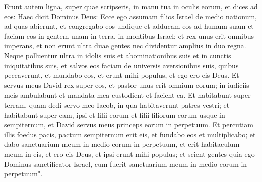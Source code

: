 \begin{biblechapter}
\verse Erunt autem ligna, super quae scripseris, in manu tua in oculis eorum, 
\verse et dices ad eos: Haec dicit Dominus Deus: Ecce ego assumam filios Israel de medio nationum, ad quas abierunt, et congregabo eos undique et adducam eos ad humum suam 
\verse et faciam eos in gentem unam in terra, in montibus Israel; et rex unus erit omnibus imperans, et non erunt ultra duae gentes nec dividentur amplius in duo regna. 
\verse Neque polluentur ultra in idolis suis et abominationibus suis et in cunctis iniquitatibus suis, et salvos eos faciam de universis aversionibus suis, quibus peccaverunt, et mundabo eos, et erunt mihi populus, et ego ero eis Deus. 
\verse Et servus meus David rex super eos, et pastor unus erit omnium eorum; in iudiciis meis ambulabunt et mandata mea custodient et facient ea. 
\verse Et habitabunt super terram, quam dedi servo meo Iacob, in qua habitaverunt patres vestri; et habitabunt super eam, ipsi et filii eorum et filii filiorum eorum usque in sempiternum, et David servus meus princeps eorum in perpetuum. 
\verse Et percutiam illis foedus pacis, pactum sempiternum erit eis, et fundabo eos et multiplicabo; et dabo sanctuarium meum in medio eorum in perpetuum, 
\verse et erit habitaculum meum in eis, et ero eis Deus, et ipsi erunt mihi populus; 
\verse et scient gentes quia ego Dominus sanctificator Israel, cum fuerit sanctuarium meum in medio eorum in perpetuum". 
\end{biblechapter}

